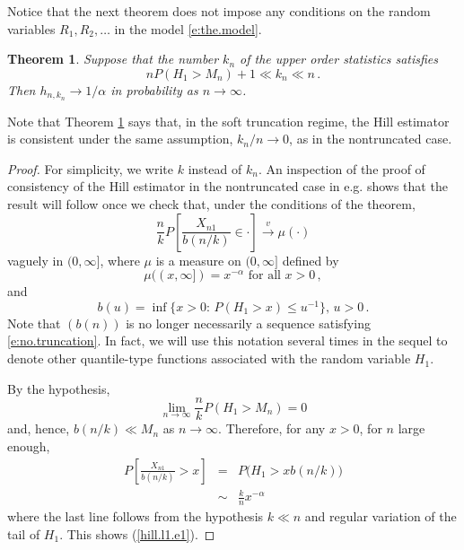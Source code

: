 \documentclass[11pt]{amsart}
\newtheorem{theorem}{Theorem}[section]
\numberwithin{equation}{section}
\begin{document}
Notice that the next theorem does not impose any conditions on the
random variables $R_1,R_2,\ldots$ in the model
\eqref{e:the.model}.

\begin{theorem}\label{hill.t1}
Suppose that the number $k_n$ of the  upper order statistics satisfies
\begin{equation} \label{e:hill.range}
nP(H_1>M_n)+1\ll k_n\ll n\,.
\end{equation}
Then $h_{n,k_n} \to 1/\alpha$ in probability as $n\to\infty$.
\end{theorem}
Note that Theorem \ref{hill.t1} says that, in the soft truncation
regime, the Hill estimator is consistent under the same assumption,
$k_n/n\to 0$, as in the nontruncated case.
\begin{proof}
For simplicity, we write $k$ instead of $k_n$.
An inspection of the proof of consistency of the Hill estimator in the
nontruncated case in e.g. \cite{resnick:2007} shows that the result
will follow once we check that, under the conditions of the theorem,
\begin{equation}\label{hill.l1.e1}
\frac nkP\left[\frac{X_{n1}}{b(n/k)}\in\cdot\right]\stackrel
 v\longrightarrow\mu(\cdot)
\end{equation}
vaguely in $(0,\infty]$, where $\mu$ is a measure on
$(0,\infty]$ defined by
$$
\mu((x,\infty])=x^{-\alpha}\mbox{ for all }x>0\,,
$$
and
$$
b(u) = \inf\bigl\{ x>0:\, P(H_1>x)\leq u^{-1}\bigr\},\,
u>0\,.
$$
Note that $(b(n))$ is no longer necessarily a sequence satisfying
\eqref{e:no.truncation}. In fact, we will use this notation several
times in the sequel to denote other quantile-type functions associated
with the random variable $H_1$.

By the hypothesis,
$$
\lim_{n\rightarrow\infty}\frac nkP(H_1>M_n)=0
$$
and, hence, $b(n/k)\ll M_n$ as $n\to\infty$. Therefore, for any $x>0$,
for $n$ large enough,
\begin{eqnarray*}
P\left[\frac{X_{n1}}{b(n/k)}>x\right]&=&P\bigl( H_1>xb(n/k)\bigr)\\
&\sim&\frac knx^{-\alpha}
\end{eqnarray*}
where the last line follows from the hypothesis $k\ll n$ and regular
variation of the tail of $H_1$.  This shows (\ref{hill.l1.e1}).
\end{proof}
\end{document}
